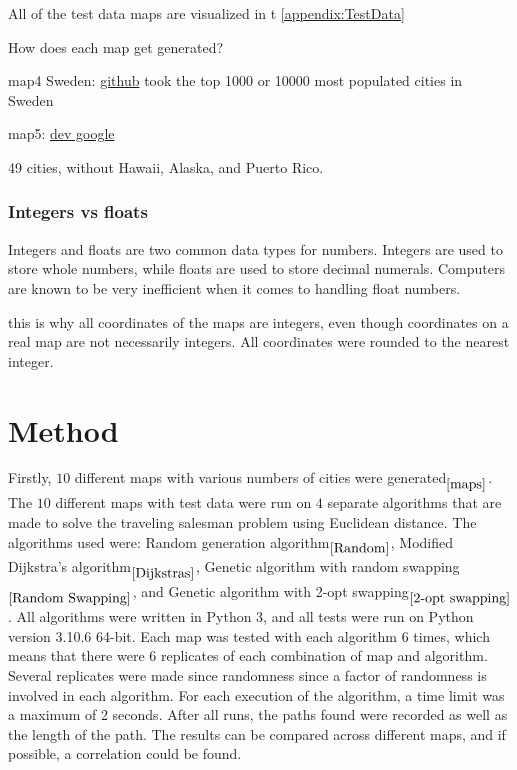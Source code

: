 \documentclass{article}
\begin{document}
All of the test data maps are visualized in t
\ref{appendix:TestData}

\noindent
How does each map get generated?


map4 Sweden: \href{https://github.com/sphrak/svenska-stader/blob/master/src/svenska-stader.csv}{github}  took the top 1000 or 10000 most populated cities in Sweden

map5: \href{https://developers.google.com/public-data/docs/canonical/states_csv}{dev google}

49 cities, without Hawaii, Alaska, and Puerto Rico.


\subsubsection{Integers vs floats}\label{Int vs Float}
Integers and floats are two common data types for numbers. Integers are used to store whole numbers, while floats are used to store decimal numerals. Computers are known to be very inefficient when it comes to handling float numbers.

this is why all coordinates of the maps are integers, even though coordinates on a real map are not necessarily integers. All coordinates were rounded to the nearest integer.




\section{Method}\label{Method}
Firstly, $10$ different maps with various numbers of cities were generated$_{\ref{maps}}$. The $10$ different maps with test data were run on $4$ separate algorithms that are made to solve the traveling salesman problem using Euclidean distance. The algorithms used were: Random generation algorithm$_{\ref{Random}}$, Modified Dijkstra's algorithm$_{\ref{Dijkstras}}$, Genetic algorithm with random swapping$_{\ref{Random Swapping}}$, and Genetic algorithm with 2-opt swapping$_{\ref{2-opt swapping}}$. All algorithms were written in Python 3, and all tests were run on Python version 3.10.6 64-bit. Each map was tested with each algorithm $6$ times, which means that there were $6$ replicates of each combination of map and algorithm. Several replicates were made since randomness since a factor of randomness is involved in each algorithm. For each execution of the algorithm, a time limit was a maximum of 2 seconds. After all runs, the paths found were recorded as well as the length of the path. The results can be compared across different maps, and if possible, a correlation could be found. 
\end{document}
